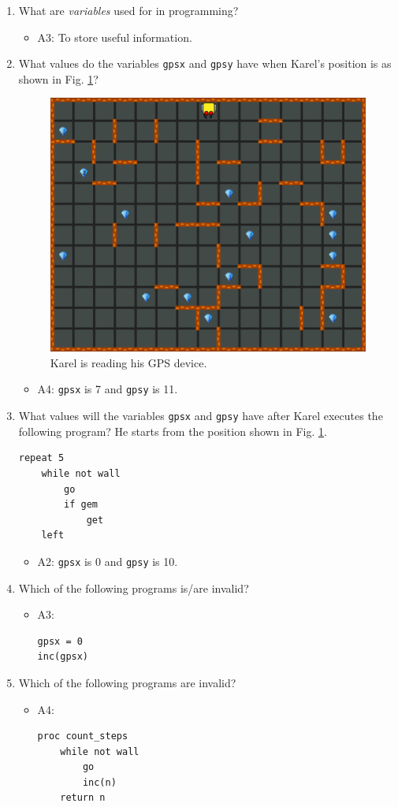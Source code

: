 \documentclass[article,A4,12pt]{llncs}
\begin{document}
\begin{enumerate}
\item What are {\em variables} used for in programming? 
  \begin{itemize}
    \item A3: To store useful information.
  \end{itemize}
\item What values do the variables {\tt gpsx} and {\tt gpsy} have when Karel's
position is as shown in Fig. \ref{fig:var2s}?
\begin{figure}[!ht]
\begin{center}
\includegraphics[height=0.4\textwidth]{imgk/variables2.png}
\end{center}
\vspace{-4mm}
\caption{Karel is reading his GPS device.}
\label{fig:var2s}
\end{figure}
\noindent
  \begin{itemize}
    \item A4: {\tt gpsx} is 7 and {\tt gpsy} is 11.
  \end{itemize}
\item What values will the variables {\tt gpsx} and {\tt gpsy} have after
Karel executes the following program? He starts from the position shown 
in Fig. \ref{fig:var2s}.
\begin{verbatim}
repeat 5
    while not wall
        go
        if gem
            get
    left
\end{verbatim}
  \begin{itemize}
    \item A2: {\tt gpsx} is 0 and {\tt gpsy} is 10.
  \end{itemize}
\item Which of the following programs is/are invalid?
  \begin{itemize}
    \item A3:
\begin{verbatim}
gpsx = 0
inc(gpsx)
\end{verbatim}
  \end{itemize}
\item Which of the following programs are invalid?
  \begin{itemize}
    \item A4:
\begin{verbatim}
proc count_steps
    while not wall
        go
        inc(n)
    return n
\end{verbatim}
  \end{itemize}
\end{enumerate}
\end{document}

